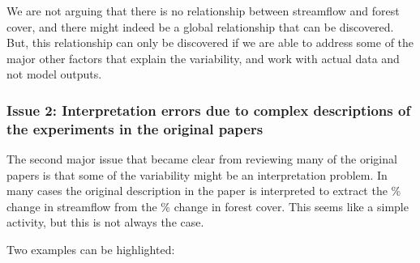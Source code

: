 \documentclass[]{elsarticle} %
\begin{document}
We are not arguing that there is no relationship between streamflow and forest cover, and there might indeed be a global relationship that can be discovered. But, this relationship can only be discovered if we are able to address some of the major other factors that explain the variability, and work with actual data and not model outputs.

\hypertarget{issue-2-interpretation-errors-due-to-complex-descriptions-of-the-experiments-in-the-original-papers}{%
\subsubsection{Issue 2: Interpretation errors due to complex descriptions of the experiments in the original papers}\label{issue-2-interpretation-errors-due-to-complex-descriptions-of-the-experiments-in-the-original-papers}}

The second major issue that became clear from reviewing many of the original papers is that some of the variability might be an interpretation problem. In many cases the original description in the paper is interpreted to extract the \% change in streamflow from the \% change in forest cover. This seems like a simple activity, but this is not always the case.

Two examples can be highlighted:
\end{document}
